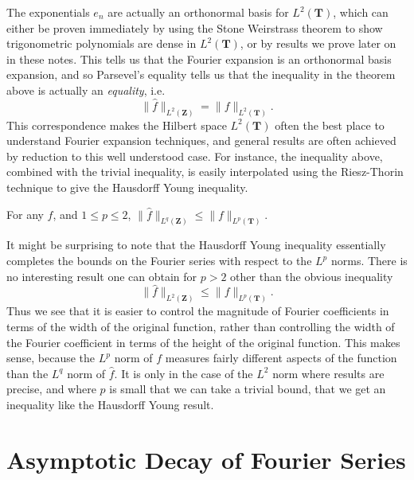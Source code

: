 The exponentials $e_n$ are actually an orthonormal basis for $L^2(\mathbf{T})$, which can either be proven immediately by using the Stone Weirstrass theorem to show trigonometric polynomials are dense in $L^2(\mathbf{T})$, or by results we prove later on in these notes. This tells us that the Fourier expansion is an orthonormal basis expansion, and so Parsevel's equality tells us that the inequality in the theorem above is actually an {\it equality}, i.e.
%
\[ \| \widehat{f} \|_{L^2(\mathbf{Z})} = \| f \|_{L^2(\mathbf{T})}. \]
%
This correspondence makes the Hilbert space $L^2(\mathbf{T})$ often the best place to understand Fourier expansion techniques, and general results are often achieved by reduction to this well understood case. For instance, the inequality above, combined with the trivial inequality, is easily interpolated using the Riesz-Thorin technique to give the Hausdorff Young inequality.

\begin{theorem}
	For any $f$, and $1 \leq p \leq 2$, $\| \widehat{f} \|_{L^q(\mathbf{Z})} \leq \| f \|_{L^p(\mathbf{T})}$.
\end{theorem}

It might be surprising to note that the Hausdorff Young inequality essentially completes the bounds on the Fourier series with respect to the $L^p$ norms. There is no interesting result one can obtain for $p > 2$ other than the obvious inequality
%
\[ \| \widehat{f} \|_{L^2(\mathbf{Z})} \leq \| f \|_{L^p(\mathbf{T})}. \]
%
Thus we see that it is easier to control the magnitude of Fourier coefficients in terms of the width of the original function, rather than controlling the width of the Fourier coefficient in terms of the height of the original function. This makes sense, because the $L^p$ norm of $f$ measures fairly different aspects of the function than the $L^q$ norm of $\widehat{f}$. It is only in the case of the $L^2$ norm where results are precise, and where $p$ is small that we can take a trivial bound, that we get an inequality like the Hausdorff Young result.

\section{Asymptotic Decay of Fourier Series}

